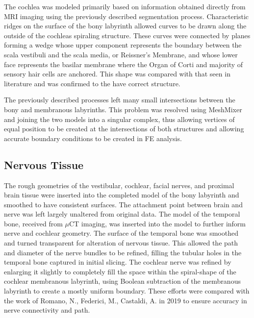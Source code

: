 \documentclass[12pt]{article}
\begin{document}
The cochlea was modeled primarily based on information obtained directly from MRI imaging using the previously described segmentation process. Characteristic ridges on the surface of the bony labyrinth allowed curves to be drawn along the outside of the cochleas spiraling structure. These curves were connected by planes forming a wedge whose upper component represents the boundary between the scala vestibuli and the scala media, or Reissner’s Membrane, and whose lower face represents the basilar membrane where the Organ of Corti and majority of sensory hair cells are anchored. This shape was compared with that seen in literature and was confirmed to the have correct structure. \cite{trevino:chinchmodel} \cite{ekdale:chinchanat} \cite{ni:cochmcx}


The previously described processes left many small intersections between the bony and membranous labyrinths. This problem was resolved using MeshMixer and joining the two models into a singular complex, thus allowing vertices of equal position to be created at the intersections of both structures and allowing accurate boundary conditions to be created in FE analysis. 

\subsection{Nervous Tissue}
The rough geometries of the vestibular, cochlear, facial nerves, and proximal brain tissue were inserted into the completed model of the bony labyrinth and smoothed to have consistent surfaces. The attachment point between brain and nerve was left largely unaltered from original data. The model of the temporal bone, received from $\mu$CT imaging, was inserted into the model to further inform nerve and cochlear geometry. The surface of the temporal bone was smoothed and turned transparent for alteration of nervous tissue. This allowed the path and diameter of the nerve bundles to be refined, filling the tubular holes in the temporal bone captured in initial slicing. The cochlear nerve was refined by enlarging it slightly to completely fill the space within the spiral-shape of the cochlear membranous labyrinth, using Boolean subtraction of the membranous labyrinth to create a mostly uniform boundary. These efforts were compared with the work of Romano, N., Federici, M., Castaldi, A. in 2019 to ensure accuracy in nerve connectivity and path. \cite{romano:nerves}
 
\end{document}
